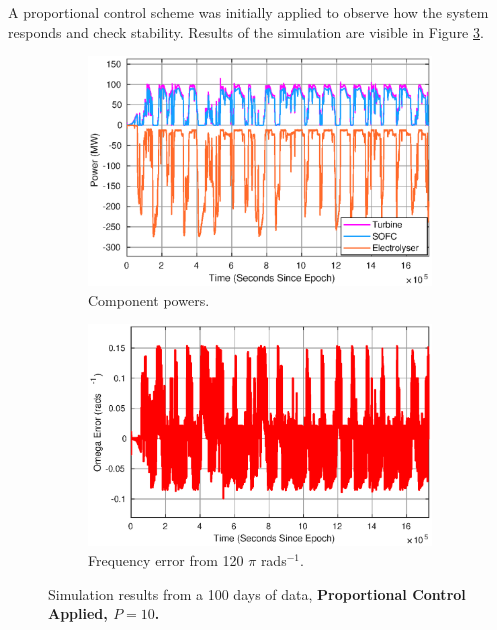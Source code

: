A proportional control scheme was initially applied to observe how the system responds and check stability.
Results of the simulation are visible in Figure \ref{fig:power-proportional}.

\begin{figure}[ht]
\centering
\begin{subfigure}{.5\textwidth}
  \centering
  \includegraphics[width=1\linewidth]{images/results/P/use.eps}
  \caption{Component powers.}
  \label{fig:sub1}
\end{subfigure}%
\begin{subfigure}{.5\textwidth}
  \centering
  \includegraphics[width=1\linewidth]{images/results/P/omega.eps}
  \caption{Frequency error from 120 $\pi$ rads$^{-1}$.}
  \label{fig:sub2}
\end{subfigure}
\caption{Simulation results from a 100 days of data, {\bf Proportional Control Applied, $P=10$.}}
\label{fig:power-proportional}
\end{figure}

